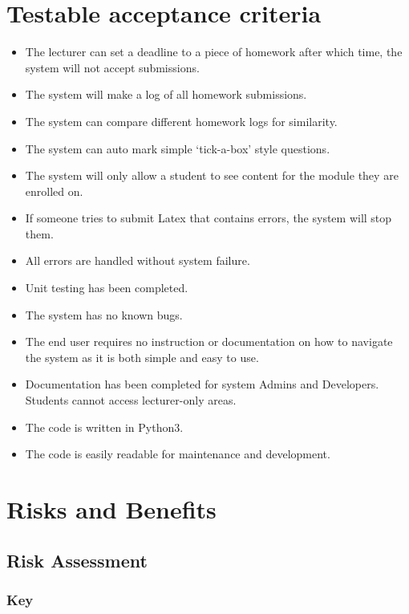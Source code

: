 \documentclass[12pt]{article}
\begin{document}
	\section{Testable acceptance criteria}
    \vspace{0.5cm}
    \begin{itemize}
\item The lecturer can set a deadline to a piece of homework after which time, the system will not accept submissions.
\item The system will make a log of all homework submissions.
\item The system can compare different homework logs for similarity.
\item The system can auto mark simple ‘tick-a-box’ style questions.
\item The system will only allow a student to see content for the module they are enrolled on.
\item If someone tries to submit Latex that contains errors, the system will stop them.
\item All errors are handled without system failure.
\item Unit testing has been completed.
\item The system has no known bugs.
\item The end user requires no instruction or documentation on how to navigate the system as it is both simple and easy to use.
\item Documentation has been completed for system Admins and Developers.
Students cannot access lecturer-only areas.
\item The code is written in Python3.
\item The code is easily readable for maintenance and development.
\end{itemize}
	

    \newpage
    
	\section{Risks and Benefits}
	
    \subsection{Risk Assessment}
    
    
    \subsubsection{Key}
    
\end{document}
